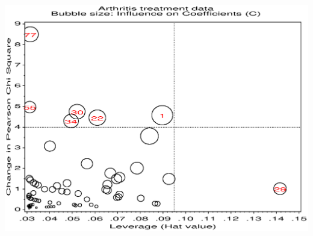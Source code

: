 \begin{center}
 \hfill
 \begin{minipage}[c]{.33\linewidth}
  \includegraphics[width=1\linewidth,clip=true]{ch6/fig/logist1b2}
 \end{minipage}
\end{center}

